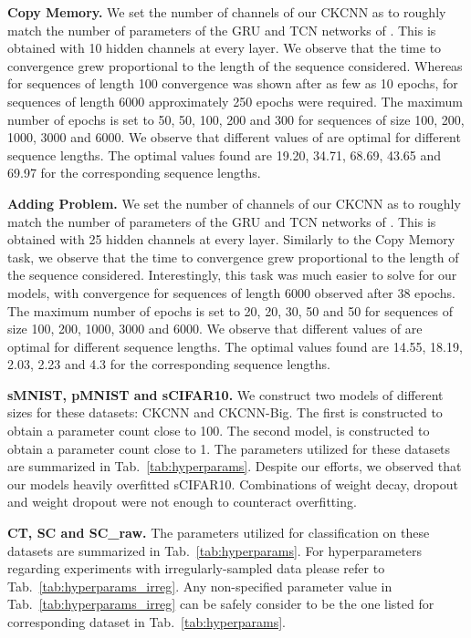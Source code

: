 \documentclass{article}
\begin{document}
\begin{table*}[t!]
\end{table*}
 \textbf{Copy Memory.} We set the number of channels of our CKCNN as to roughly match the number of parameters of the GRU and TCN networks of \citet{bai2018empirical}. This is obtained with 10 hidden channels at every layer. We observe that the time to convergence grew proportional to the length of the sequence considered. Whereas for sequences of length 100 convergence was shown after as few as 10 epochs, for sequences of length 6000 approximately 250 epochs were required. The maximum number of epochs is set to 50, 50, 100, 200 and 300 for sequences of size 100, 200, 1000, 3000 and 6000. We observe that different values of  are optimal for different sequence lengths. The optimal  values found are 19.20, 34.71, 68.69, 43.65 and 69.97 for the corresponding sequence lengths.
 
\textbf{Adding Problem.} We set the number of channels of our CKCNN as to roughly match the number of parameters of the GRU and TCN networks of \citet{bai2018empirical}. This is obtained with 25 hidden channels at every layer. Similarly to the Copy Memory task, we observe that the time to convergence grew proportional to the length of the sequence considered. Interestingly, this task was much easier to solve for our models, with convergence for sequences of length 6000 observed after 38 epochs. The maximum number of epochs is set to 20, 20, 30, 50 and 50 for sequences of size 100, 200, 1000, 3000 and 6000. We observe that different values of  are optimal for different sequence lengths. The optimal  values found are 14.55, 18.19, 2.03, 2.23 and 4.3 for the corresponding sequence lengths. 

\textbf{sMNIST, pMNIST and sCIFAR10.} We construct two models of different sizes for these datasets: CKCNN and CKCNN-Big. The first is constructed to obtain a parameter count close to 100{}. The second model, is constructed to obtain a parameter count close to 1{}. The parameters utilized for these datasets are summarized in Tab.~\ref{tab:hyperparams}. Despite our efforts, we observed that our models heavily overfitted sCIFAR10. Combinations of weight decay, dropout and weight dropout were not enough to counteract overfitting. 

\textbf{CT, SC and SC\_raw.} The parameters utilized for classification on these datasets are summarized in Tab.~\ref{tab:hyperparams}. For hyperparameters regarding experiments with irregularly-sampled data please refer to Tab.~\ref{tab:hyperparams_irreg}. Any non-specified parameter value in Tab.~\ref{tab:hyperparams_irreg} can be safely consider to be the one listed for corresponding dataset in Tab.~\ref{tab:hyperparams}.
\end{document}
